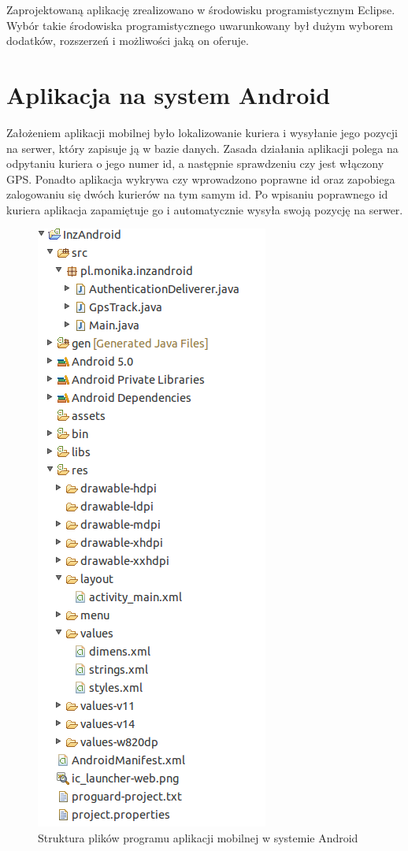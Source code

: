 \documentclass[eng,printmode,oneside]{mgr}
\begin{document}
Zaprojektowaną aplikację zrealizowano w środowisku programistycznym Eclipse.
Wybór takie środowiska programistycznego uwarunkowany był dużym wyborem
dodatków, rozszerzeń i możliwości jaką on oferuje.

\newpage
\section{Aplikacja na system Android}

Założeniem aplikacji mobilnej było lokalizowanie kuriera i wysyłanie jego
pozycji na serwer, który zapisuje ją w bazie danych. Zasada działania aplikacji
polega na odpytaniu kuriera o jego numer id, a następnie sprawdzeniu czy jest
włączony GPS. Ponadto aplikacja wykrywa czy wprowadzono poprawne id oraz
zapobiega zalogowaniu się dwóch kurierów na tym samym id. Po wpisaniu poprawnego
id kuriera aplikacja zapamiętuje go i automatycznie wysyła swoją pozycję na serwer.

\begin{figure}
\vspace{-25pt}
\centering
\captionsetup{justification=centering,margin=0cm}
\begin{center}
\includegraphics[width=.4\textwidth]{struktura_android.png}
\end{center}
\caption{Struktura plików programu aplikacji mobilnej w systemie Android}
\label{fig:androidStruktura}
\end{figure}
\end{document}
